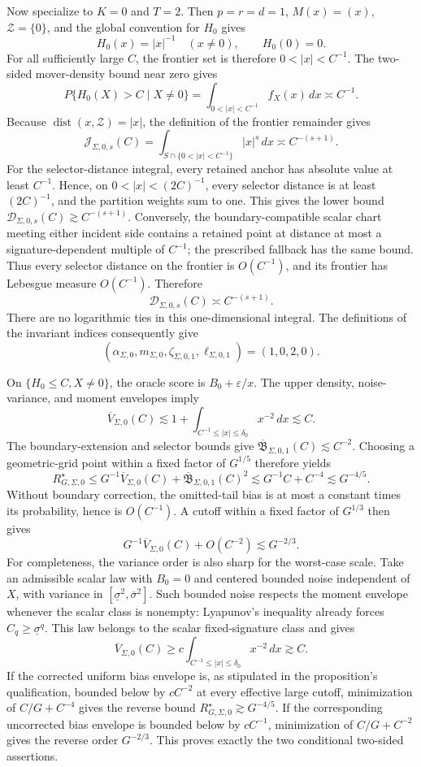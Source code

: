 Now specialize to \(K=0\) and \(T=2\).  Then \(p=r=d=1\), \(M(x)=(x)\), \(\mathcal Z=\{0\}\), and the global convention for \(H_0\) gives
\[
H_0(x)=|x|^{-1}\quad(x\ne0),
\qquad H_0(0)=0.
\]
For all sufficiently large \(C\), the frontier set is therefore \(0<|x|<C^{-1}\).  The two-sided mover-density bound near zero gives
\[
P\{H_0(X)>C\mid X\ne0\}
=\int_{0<|x|<C^{-1}}f_X(x)\,dx
\asymp C^{-1}.
\]
Because \(\operatorname{dist}(x,\mathcal Z)=|x|\), the definition of the frontier remainder gives
\[
\mathcal J_{\Sigma,0,s}(C)
=\int_{S\cap\{0<|x|<C^{-1}\}}|x|^s\,dx
\asymp C^{-(s+1)}.
\]
For the selector-distance integral, every retained anchor has absolute value at least \(C^{-1}\).  Hence, on \(0<|x|<(2C)^{-1}\), every selector distance is at least \((2C)^{-1}\), and the partition weights sum to one.  This gives the lower bound \(\mathcal D_{\Sigma,0,s}(C)\gtrsim C^{-(s+1)}\).  Conversely, the boundary-compatible scalar chart meeting either incident side contains a retained point at distance at most a signature-dependent multiple of \(C^{-1}\); the prescribed fallback has the same bound.  Thus every selector distance on the frontier is \(O(C^{-1})\), and its frontier has Lebesgue measure \(O(C^{-1})\).  Therefore
\[
\mathcal D_{\Sigma,0,s}(C)\asymp C^{-(s+1)}.
\]
There are no logarithmic ties in this one-dimensional integral.  The definitions of the invariant indices consequently give
\[
(\alpha_{\Sigma,0},m_{\Sigma,0},
\zeta_{\Sigma,0,1},\ell_{\Sigma,0,1})=(1,0,2,0).
\]

On \(\{H_0\le C,X\ne0\}\), the oracle score is \(B_0+\varepsilon/x\).  The upper density, noise-variance, and moment envelopes imply
\[
\overline V_{\Sigma,0}(C)
\lesssim 1+\int_{C^{-1}\le|x|\le\delta_0}x^{-2}\,dx
\lesssim C.
\]
The boundary-extension and selector bounds give
\(\overline{\mathfrak B}_{\Sigma,0,1}(C)\lesssim C^{-2}\).  Choosing a geometric-grid point within a fixed factor of \(G^{1/5}\) therefore yields
\[
R_{G,\Sigma,0}^{\star}
\le G^{-1}\overline V_{\Sigma,0}(C)
+\overline{\mathfrak B}_{\Sigma,0,1}(C)^2
\lesssim G^{-1}C+C^{-4}
\lesssim G^{-4/5}.
\]
Without boundary correction, the omitted-tail bias is at most a constant times its probability, hence is \(O(C^{-1})\).  A cutoff within a fixed factor of \(G^{1/3}\) then gives
\[
G^{-1}\overline V_{\Sigma,0}(C)+O(C^{-2})
\lesssim G^{-2/3}.
\]
For completeness, the variance order is also sharp for the worst-case scale.  Take an admissible scalar law with \(B_0=0\) and centered bounded noise independent of \(X\), with variance in \([\underline\sigma^2,\overline\sigma^2]\).  Such bounded noise respects the moment envelope whenever the scalar class is nonempty: Lyapunov's inequality already forces \(C_q\ge\underline\sigma^q\).  This law belongs to the scalar fixed-signature class and gives
\[
\overline V_{\Sigma,0}(C)
\ge c\int_{C^{-1}\le|x|\le\delta_0}x^{-2}\,dx
\gtrsim C.
\]
If the corrected uniform bias envelope is, as stipulated in the proposition's qualification, bounded below by \(cC^{-2}\) at every effective large cutoff, minimization of \(C/G+C^{-4}\) gives the reverse bound \(R_{G,\Sigma,0}^{\star}\gtrsim G^{-4/5}\).  If the corresponding uncorrected bias envelope is bounded below by \(cC^{-1}\), minimization of \(C/G+C^{-2}\) gives the reverse order \(G^{-2/3}\).  This proves exactly the two conditional two-sided assertions.

